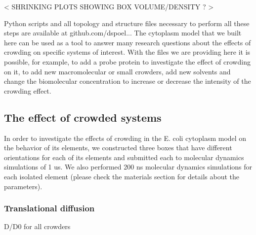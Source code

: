 \documentclass[journal=jacsat,manuscript=article]{achemso}
\begin{document}
< SHRINKING PLOTS SHOWING BOX VOLUME/DENSITY ? >


Python scripts and all topology and structure files necessary to perform all these steps are available at github.com/dspoel... The cytoplasm model that we built here can be used as a tool to answer many research questions about the effects of crowding on specific systems of interest. With the files we are providing here it is possible, for example, to add a probe protein to investigate the effect of crowding on it, to add new macromolecular or small crowders, add new solvents and change the biomolecular concentration to increase or decrease the intensity of the crowding effect.
 


\subsection{The effect of crowded systems}

In order to investigate the effects of crowding in the E. coli cytoplasm model on the behavior of its elements, we constructed three boxes that have different orientations for each of its elements and submitted each to molecular dynamics simulations of 1 us. We also performed 200 ns molecular dynamics simulations for each isolated element (please check the materials section for details about the parameters).

\subsubsection{Translational diffusion}
D/D0 for all crowders
\end{document}
